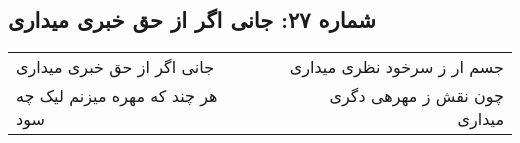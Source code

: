 \begin{center}
\section*{شماره ۲۷: جانی اگر از حق خبری میداری}
\label{sec:027}
\begin{longtable}{l p{0.5cm} r}
جانی اگر از حق خبری میداری
&&
جسم ار ز سرخود نظری میداری
\\
هر چند که مهره میزنم لیک چه سود
&&
چون نقش ز مهرهی دگری میداری
\\
\end{longtable}
\end{center}
